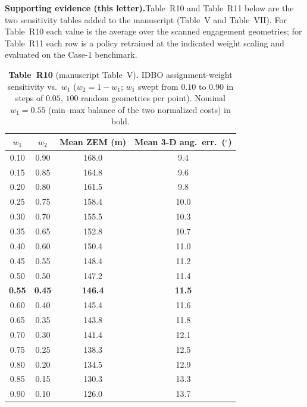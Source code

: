 \documentclass[11pt]{article}
\newcommand{\evi}{\medskip\noindent\textbf{Supporting evidence (this letter).}\quad}
\begin{document}
\evi Table~R10 and Table~R11 below are the two sensitivity tables added to the manuscript
(Table~V and Table~VII). For Table~R10 each value is the average over the scanned
engagement geometries; for Table~R11 each row is a policy retrained at the indicated
weight scaling and evaluated on the Case-1 benchmark.

\begin{table}[h]
\centering
\captionsetup{font=small}
\caption*{\small\textbf{Table~R10} (manuscript Table~V)\textbf{.} IDBO assignment-weight
sensitivity vs.\ $w_1$ ($w_2{=}1{-}w_1$; $w_1$ swept from $0.10$ to $0.90$ in steps of
$0.05$, $100$ random geometries per point). Nominal $w_1{=}0.55$ (min--max balance of the
two normalized costs) in bold.}
\renewcommand{\arraystretch}{1.15}
\begin{tabular}{cccc}
\hline\hline
$w_1$ & $w_2$ & Mean ZEM (m) & Mean 3-D ang.\ err.\ ($^{\circ}$) \\ \hline
0.10 & 0.90 & 168.0 & 9.4 \\
0.15 & 0.85 & 164.8 & 9.6 \\
0.20 & 0.80 & 161.5 & 9.8 \\
0.25 & 0.75 & 158.4 & 10.0 \\
0.30 & 0.70 & 155.5 & 10.3 \\
0.35 & 0.65 & 152.8 & 10.7 \\
0.40 & 0.60 & 150.4 & 11.0 \\
0.45 & 0.55 & 148.4 & 11.2 \\
0.50 & 0.50 & 147.2 & 11.4 \\
\textbf{0.55} & \textbf{0.45} & \textbf{146.4} & \textbf{11.5} \\
0.60 & 0.40 & 145.4 & 11.6 \\
0.65 & 0.35 & 143.8 & 11.8 \\
0.70 & 0.30 & 141.4 & 12.1 \\
0.75 & 0.25 & 138.3 & 12.5 \\
0.80 & 0.20 & 134.5 & 12.9 \\
0.85 & 0.15 & 130.3 & 13.3 \\
0.90 & 0.10 & 126.0 & 13.7 \\
\hline
\end{tabular}
\end{table}
\end{document}
